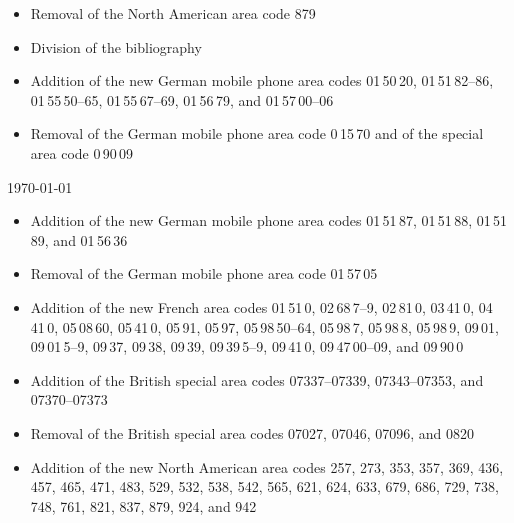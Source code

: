 \documentclass[numbers=noenddot]{scrreprt}
\begin{document}
\begin{description}
\begin{itemize}
\item Removal of the North American area code 879
\item Division of the bibliography
\end{itemize}
\item[2.6] 
\begin{itemize}
\item Addition of the new German mobile phone area codes 01\,50\,20, 01\,51\,82--86, 01\,55\,50--65, 01\,55\,67--69, 01\,56\,79, and 01\,57\,00--06
\item Removal of the German mobile phone area code 0\,15\,70 and of the special area code 0\,90\,09
\end{itemize}
\item[2.7] \today
\begin{itemize}
\item Addition of the new German mobile phone area codes 01\,51\,87, 01\,51\,88, 01\,51\,89, and 01\,56\,36
\item Removal of the German mobile phone area code 01\,57\,05
\item Addition of the new French area codes 01\,51\,0, 02\,68\,7--9, 02\,81\,0, 03\,41\,0, 04\,41\,0, 05\,08\,60, 05\,41\,0, 05\,91, 05\,97, 05\,98\,50--64, 05\,98\,7, 05\,98\,8, 05\,98\,9, 09\,01, 09\,01\,5--9, 09\,37, 09\,38, 09\,39, 09\,39\,5--9, 09\,41\,0, 09\,47\,00--09, and 09\,90\,0
\item Addition of the British special area codes 07337--07339, 07343--07353, and 07370--07373
\item Removal of the British special area codes 07027, 07046, 07096, and 0820
\item Addition of the new North American area codes 257, 273, 353, 357, 369, 436, 457, 465, 471, 483, 529, 532, 538, 542, 565, 621, 624, 633, 679, 686, 729, 738, 748, 761, 821, 837, 879, 924, and 942
\end{itemize}
\end{description}
\end{document}

